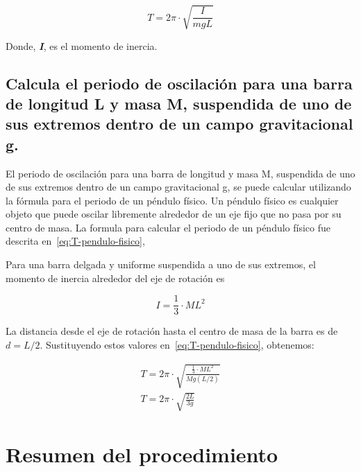 \documentclass[twocolumn, 12pt]{article}
\newcommand{\bolditalic}[1]{\textbf{\textit{#1}}}
\begin{document}
{\large
\begin{equation}
    T = 2\pi \cdot \sqrt{\frac{I}{m g L}}
    \label{eq:T-pendulo-fisico}
\end{equation}
}

Donde, \bolditalic{I}, es el momento de inercia.

\nocite{tipos-pendulos-1}

\subsection{Calcula el periodo de oscilación para una barra de longitud L y masa M, suspendida de uno de
    sus extremos dentro de un campo gravitacional g.}

El periodo de oscilación para una barra de longitud y masa
M, suspendida de uno de sus extremos dentro de un campo
gravitacional g, se puede calcular utilizando la fórmula
para el periodo de un péndulo físico. Un péndulo físico es
cualquier objeto que puede oscilar libremente alrededor de
un eje fijo que no pasa por su centro de masa. La formula
para calcular el periodo de un péndulo físico fue descrita
en~\ref{eq:T-pendulo-fisico},

Para una barra delgada y uniforme suspendida a uno de sus
extremos, el momento de inercia alrededor del eje de
rotación es

    {\large
        \begin{equation}
            I = \frac{1}{3}\cdot M L^{2}
            \label{eq:momento-inercia-barra-delgada}
        \end{equation}
    }

La distancia desde el eje de rotación hasta el centro de
masa de la barra es de $d = L / 2$. Sustituyendo estos
valores en~\ref{eq:T-pendulo-fisico}, obtenemos:

{\large
\begin{equation}
    \begin{gathered}
        T = 2\pi \cdot \sqrt{\frac{\frac{1}{3}\cdot M L^{2}}{M g (L / 2) }} \\
        T = 2\pi \cdot \sqrt{\frac{2L}{3g}}
    \end{gathered}
\end{equation}
}

\section{Resumen del procedimiento}
\end{document}

